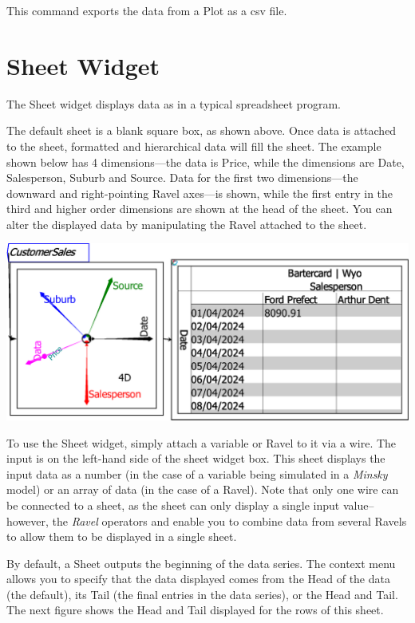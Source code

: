 This command exports the data from a Plot as a csv file.

\section{Sheet Widget}

\label{Sheet}


The Sheet widget displays data as in a typical spreadsheet program.

The default sheet is a blank square box, as shown above. Once data
is attached to the sheet, formatted and hierarchical data will fill
the sheet. The example shown below has 4 dimensions---the data is
Price, while the dimensions are Date, Salesperson, Suburb and Source.
Data for the first two dimensions---the downward and right-pointing
Ravel axes---is shown, while the first entry in the third and higher
order dimensions are shown at the head of the sheet. You can alter
the displayed data by manipulating the Ravel attached to the sheet.

\includegraphics[width=\textwidth]{images/sheetBasics}

To use the Sheet widget, simply attach a variable or Ravel to it via
a wire. The input is on the left-hand side of the sheet widget box.
This sheet displays the input data as a number (in the case of a variable
being simulated in a \emph{Minsky} model) or an array of data (in
the case of a Ravel). Note that only one wire can be connected to
a sheet, as the sheet can only display a single input value--however,
the \emph{Ravel} operators  and
 enable
you to combine data from several Ravels to allow them to be displayed
in a single sheet.

By default, a Sheet outputs the beginning of the data series. The
context menu allows you to specify that the data displayed comes from
the Head of the data (the default), its Tail (the final entries in
the data series), or the Head and Tail. The next figure shows the
Head and Tail displayed for the rows of this sheet.

